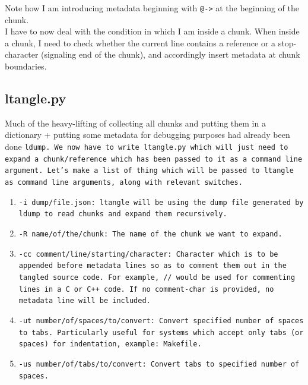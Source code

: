 Note how I am introducing metadata beginning with \verb|@->| at the beginning of the chunk. \\

I have to now deal with the condition in which I am inside a chunk. When inside a chunk, I need to check
whether the current line contains a reference or a stop-character (signaling end of the chunk), and
accordingly insert metadata at chunk boundaries.


\subsection{ltangle.py}

Much of the heavy-lifting of collecting all chunks and putting them in a dictionary + putting some metadata
for debugging purposes had already been done \tt ldump\rm. We now have to write \tt ltangle.py \rm which
will just need to expand a chunk/reference which has been passed to it as a command line argument. Let's make
a list of thing which will be passed to \tt ltangle \rm as command line arguments, along with relevant
switches. 

\begin{enumerate}
    \item \tt -i dump/file.json\rm: \tt ltangle \rm will be using the dump file generated by \tt ldump \rm to
    read chunks and expand them recursively.
    \item \tt -R name/of/the/chunk\rm: The name of the chunk we want to expand. 
    \item \tt -cc comment/line/starting/character\rm: Character which is to be appended before metadata lines
    so as to comment them out in the tangled source code. For example, \verb|//| would be used for commenting
    lines in a C or C++ code. If no comment-char is provided, no metadata line will be included.
    \item \tt -ut number/of/spaces/to/convert\rm: Convert specified number of spaces to tabs. Particularly
    useful for systems which accept only tabs (or spaces) for indentation, example: Makefile.
    \item \tt -us number/of/tabs/to/convert\rm: Convert tabs to specified number of spaces.
\end{enumerate}

